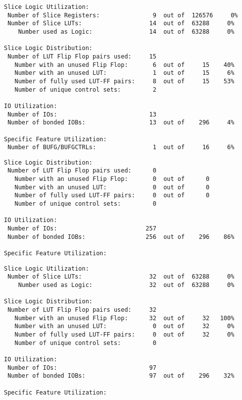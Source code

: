 \begin{verbatim}
Slice Logic Utilization: 
 Number of Slice Registers:               9  out of  126576     0%  
 Number of Slice LUTs:                   14  out of  63288     0%  
    Number used as Logic:                14  out of  63288     0%  

Slice Logic Distribution: 
 Number of LUT Flip Flop pairs used:     15
   Number with an unused Flip Flop:       6  out of     15    40%  
   Number with an unused LUT:             1  out of     15     6%  
   Number of fully used LUT-FF pairs:     8  out of     15    53%  
   Number of unique control sets:         2

IO Utilization: 
 Number of IOs:                          13
 Number of bonded IOBs:                  13  out of    296     4%  

Specific Feature Utilization:
 Number of BUFG/BUFGCTRLs:                1  out of     16     6%  
\end{verbatim}

\begin{verbatim}
Slice Logic Distribution: 
 Number of LUT Flip Flop pairs used:      0
   Number with an unused Flip Flop:       0  out of      0         
   Number with an unused LUT:             0  out of      0         
   Number of fully used LUT-FF pairs:     0  out of      0         
   Number of unique control sets:         0

IO Utilization: 
 Number of IOs:                         257
 Number of bonded IOBs:                 256  out of    296    86%  

Specific Feature Utilization:
\end{verbatim}

\begin{verbatim}
Slice Logic Utilization: 
 Number of Slice LUTs:                   32  out of  63288     0%  
    Number used as Logic:                32  out of  63288     0%  

Slice Logic Distribution: 
 Number of LUT Flip Flop pairs used:     32
   Number with an unused Flip Flop:      32  out of     32   100%  
   Number with an unused LUT:             0  out of     32     0%  
   Number of fully used LUT-FF pairs:     0  out of     32     0%  
   Number of unique control sets:         0

IO Utilization: 
 Number of IOs:                          97
 Number of bonded IOBs:                  97  out of    296    32%  

Specific Feature Utilization:
\end{verbatim}

